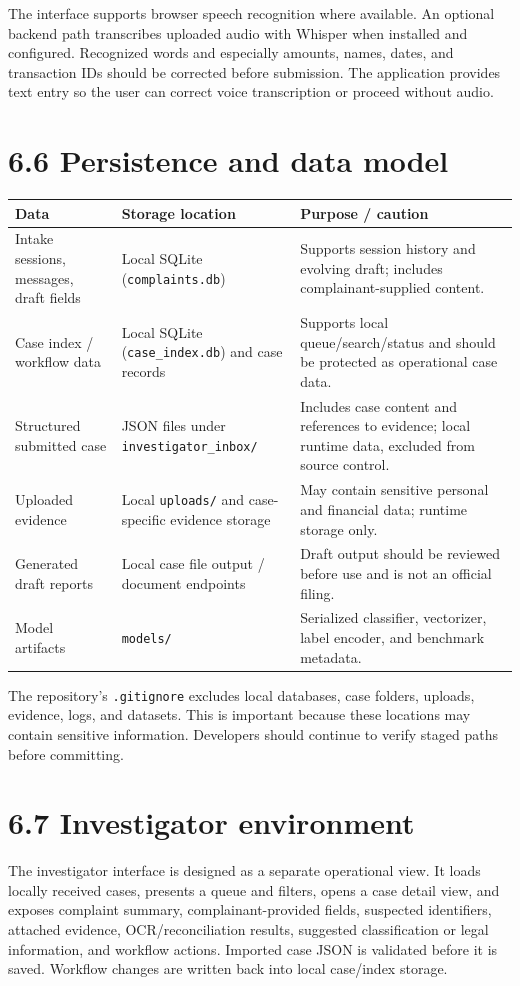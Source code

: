 \documentclass[12pt,a4paper,oneside]{report}
\begin{document}
The interface supports browser speech recognition where available. An optional backend path transcribes uploaded audio with Whisper when installed and configured. Recognized words and especially amounts, names, dates, and transaction IDs should be corrected before submission. The application provides text entry so the user can correct voice transcription or proceed without audio.

\section{6.6 Persistence and data model}
\begin{longtable}{p{}p{}p{}}
\toprule
\textbf{Data} & \textbf{Storage location} & \textbf{Purpose / caution} \\
\midrule
Intake sessions, messages, draft fields & Local SQLite (\texttt{complaints.db}) & Supports session history and evolving draft; includes complainant-supplied content. \\
Case index / workflow data & Local SQLite (\texttt{case\_index.db}) and case records & Supports local queue/search/status and should be protected as operational case data. \\
Structured submitted case & JSON files under \texttt{investigator\_inbox/} & Includes case content and references to evidence; local runtime data, excluded from source control. \\
Uploaded evidence & Local \texttt{uploads/} and case-specific evidence storage & May contain sensitive personal and financial data; runtime storage only. \\
Generated draft reports & Local case file output / document endpoints & Draft output should be reviewed before use and is not an official filing. \\
Model artifacts & \texttt{models/} & Serialized classifier, vectorizer, label encoder, and benchmark metadata. \\
\bottomrule
\end{longtable}
The repository's \texttt{.gitignore} excludes local databases, case folders, uploads, evidence, logs, and datasets. This is important because these locations may contain sensitive information. Developers should continue to verify staged paths before committing.

\section{6.7 Investigator environment}
The investigator interface is designed as a separate operational view. It loads locally received cases, presents a queue and filters, opens a case detail view, and exposes complaint summary, complainant-provided fields, suspected identifiers, attached evidence, OCR/reconciliation results, suggested classification or legal information, and workflow actions. Imported case JSON is validated before it is saved. Workflow changes are written back into local case/index storage.
\end{document}
